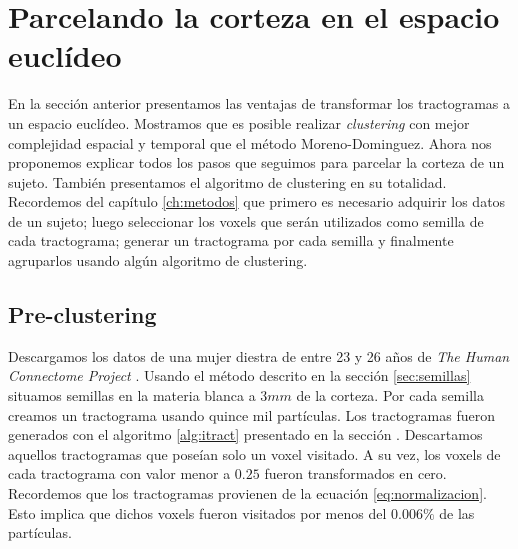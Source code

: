 \section{Parcelando la corteza en el espacio eucl\'ideo} 
\label{ch:nuestro}

En la secci\'on anterior presentamos las ventajas de transformar los
tractogramas a un espacio eucl\'ideo. Mostramos que es posible realizar
\textit{clustering} con mejor complejidad espacial y temporal que el 
m\'etodo Moreno-Dominguez. Ahora nos proponemos explicar todos los pasos
que seguimos para parcelar la corteza de un sujeto. Tambi\'en presentamos
el algoritmo de clustering en su totalidad. Recordemos del cap\'itulo 
\ref{ch:metodos} que primero es necesario adquirir los datos de un sujeto;
luego seleccionar los voxels que ser\'an utilizados como semilla de cada
tractograma; generar un tractograma por cada semilla y finalmente
agruparlos usando alg\'un algoritmo de clustering. \\

\subsection{Pre-clustering}
\label{sec:preclustering}
Descargamos los datos de una mujer diestra de entre 23 y 26 a\~nos de 
\textit{The Human Connectome Project} \cite{VanEssen2012}. Usando el 
m\'etodo descrito en la secci\'on \ref{sec:semillas} situamos semillas en
la materia blanca a $3mm$ de la corteza. Por cada semilla creamos un
tractograma usando quince mil part\'iculas. Los tractogramas fueron 
generados con el algoritmo \ref{alg:itract} presentado en la secci\'on 
\label{sec:convergencia}. Descartamos aquellos tractogramas que pose\'ian
solo un voxel visitado. A su vez, los voxels de cada tractograma con valor
menor a $0.25$ fueron transformados en cero. Recordemos que los
tractogramas provienen de la ecuaci\'on \ref{eq:normalizacion}. Esto
implica que dichos voxels fueron visitados por menos del $0.006\%$ de las
part\'iculas. \\

\settowidth{}
\addtolength\mylen{\parindent}

